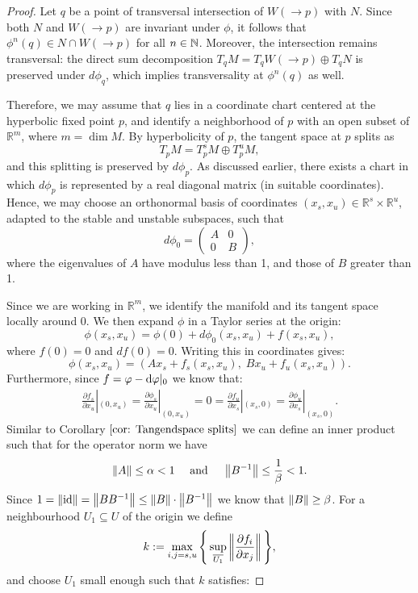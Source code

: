 \begin{proof}
	
	Let \( q \) be a point of transversal intersection of \( W(\to p) \) with \( N \). Since both \( N \) and \( W(\to p) \) are invariant under \( \phi \), it follows that \( \phi^n(q) \in N \cap W(\to p) \) for all \( n \in \mathbb{N} \). Moreover, the intersection remains transversal: the direct sum decomposition \( T_q M = T_q W(\to p) \oplus T_q N \) is preserved under \( d\phi_q \), which implies transversality at \( \phi^n(q) \) as well.
	
	Therefore, we may assume that \( q \) lies in a coordinate chart centered at the hyperbolic fixed point \( p \), and identify a neighborhood of \( p \) with an open subset of \( \mathbb{R}^m \), where \( m = \dim M \). By hyperbolicity of \( p \), the tangent space at \( p \) splits as
	\[
	T_p M = T^s_p M \oplus T^u_p M,
	\]
	and this splitting is preserved by \( d\phi_p \). As discussed earlier, there exists a chart in which \( d\phi_p \) is represented by a real diagonal matrix (in suitable coordinates). Hence, we may choose an orthonormal basis of coordinates \( (x_s, x_u) \in \mathbb{R}^s \times \mathbb{R}^u \), adapted to the stable and unstable subspaces, such that
	\[
	d\phi_0 =
	\begin{pmatrix}
		A & 0 \\
		0 & B
	\end{pmatrix},
	\]
	where the eigenvalues of \( A \) have modulus less than 1, and those of \( B \) greater than 1.
	
	Since we are working in \( \mathbb{R}^m \), we identify the manifold and its tangent space locally around 0. We then expand \( \phi \) in a Taylor series at the origin:
	\[
	\phi(x_s, x_u) = \phi(0) + d\phi_0(x_s, x_u) + f(x_s, x_u),
	\]
	where \( f(0) = 0 \) and \( df(0) = 0 \). Writing this in coordinates gives:
	\begin{equation} \label{eq: proof of Lambda lemma phi split}
		\phi(x_s, x_u) = (A x_s + f_s(x_s, x_u),\; B x_u + f_u(x_s, x_u)).
	\end{equation}
	Furthermore, since $f=\varphi-\mathop{}\!\mathrm{d} \varphi|_0$ we know that: 
	\begin{align*}
		\frac{\partial f_s}{\partial x_u}|_{(0,x_u)}=\frac{\partial \phi_s}{\partial x_u}|_{(0,x_u)}=0=\frac{\partial f_u}{\partial x_s}|_{(x_s,0)}=\frac{\partial \phi_u}{\partial x_s}|_{(x_s,0)}.
	\end{align*} Similar to Corollary $\ref{cor: Tangendspace splits}$ we can define an inner product such that for the operator norm we have 
	\begin{align*}
		\left\lVert A\right\rVert\leq \alpha <1 \quad \text{ and } \quad \left\lVert B^{-1}\right\rVert\leq \frac{1}{\beta} <1.
	\end{align*}
	Since $1=\left\lVert\operatorname{\mathrm{id}}\right\rVert=\left\lVert BB^{-1}\right\rVert\leq \left\lVert B\right\rVert\cdot \left\lVert B^{-1}\right\rVert$ we know that $\left\lVert B\right\rVert\geq \beta$.
	For a neighbourhood $U_1\subseteq U$ of the origin we define 
	\begin{align*}
		k:=\max_{i,j=s,u} \Bigg\{ \sup_{\overline{U_1}}\left\lVert\frac{\partial f_i}{\partial x_j}\right\rVert \Bigg\},
	\end{align*} and choose $U_1$ small enough such that $k$ satisfies:
	

\end{proof}
